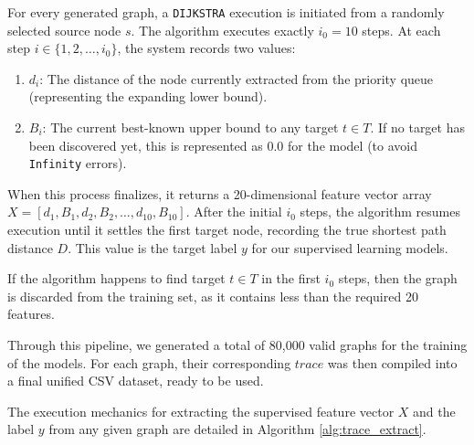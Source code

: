 For every generated graph, a \texttt{DIJKSTRA} execution is initiated from a randomly selected source node $s$. The algorithm executes exactly $i_0 = 10$ steps. At each step $i \in \{1, 2, \dots, i_0\}$, the system records two values:

\begin{enumerate}
    \item $d_i$: The distance of the node currently extracted from the priority queue (representing the expanding lower bound).
    \item $B_i$: The current best-known upper bound to any target $t \in T$. If no target has been discovered yet, this is represented as $0.0$ for the model (to avoid \texttt{Infinity} errors).
\end{enumerate}


When this process finalizes, it returns a 20-dimensional feature vector array $X = [d_1, B_1, d_2, B_2, \dots, d_{10}, B_{10}]$. After the initial $i_0$ steps, the algorithm resumes execution until it settles the first target node, recording the true shortest path distance $D$. This value is the target label $y$ for our supervised learning models.

If the algorithm happens to find target $t \in T$ in the first $i_0$ steps, then the graph is discarded from the training set, as it contains less than the required 20 features.

Through this pipeline, we generated a total of 80,000 valid graphs for the training of the models. For each graph, their corresponding $trace$ was then compiled into a final unified CSV dataset, ready to be used. 

The execution mechanics for extracting the supervised feature vector $X$ and the label $y$ from any given graph are detailed in Algorithm \ref{alg:trace_extract}.


